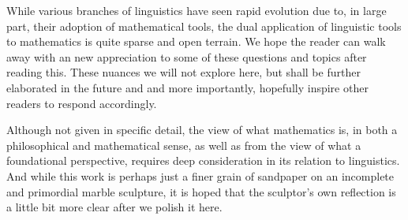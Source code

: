 While various branches of linguistics have seen rapid evolution due to, in large
part, their adoption of mathematical tools, the dual application of linguistic
tools to mathematics is quite sparse and open terrain. We hope the reader can
walk away with an new appreciation to some of these questions and topics after
reading this. These nuances we will not explore here, but shall be further
elaborated in the future and and more importantly, hopefully inspire other
readers to respond accordingly.

Although not given in specific detail, the view of what mathematics is, in both
a philosophical and mathematical sense, as well as from the view of what a
foundational perspective, requires deep consideration in its relation to
linguistics. And while this work is perhaps just a finer grain of sandpaper on
an incomplete and primordial marble sculpture, it is hoped that the sculptor's
own reflection is a little bit more clear after we polish it here.
